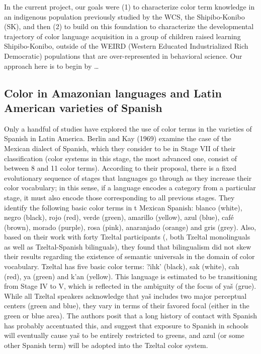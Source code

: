 \documentclass[man]{apa6}
\theoremstyle{definition}
\theoremstyle{definition}
\theoremstyle{definition}
\theoremstyle{remark}
\begin{document}
In the current project, our goals were (1) to characterize color term
knowledge in an indigenous population previously studied by the WCS, the
Shipibo-Konibo (SK), and then (2) to build on this foundation to
characterize the developmental trajectory of color language acquisition
in a group of children raised learning Shipibo-Konibo, outside of the
WEIRD (Western Educated Industrialized Rich Democratic) populations that
are over-represented in behavioral science. Our approach here is to
begin by \ldots{}

\subsection{Color in Amazonian languages and Latin American varieties of
Spanish}\label{color-in-amazonian-languages-and-latin-american-varieties-of-spanish}

Only a handful of studies have explored the use of color terms in the
varieties of Spanish in Latin America. Berlin and Kay (1969) examine the
case of the Mexican dialect of Spanish, which they consider to be in
Stage VII of their classification (color systems in this stage, the most
advanced one, consist of between 8 and 11 color terms). According to
their proposal, there is a fixed evolutionary sequence of stages that
languages go through as they increase their color vocabulary; in this
sense, if a language encodes a category from a particular stage, it must
also encode those corresponding to all previous stages. They identify
the following basic color terms in t Mexican Spanish: blanco (white),
negro (black), rojo (red), verde (green), amarillo (yellow), azul
(blue), café (brown), morado (purple), rosa (pink), anaranjado (orange)
and gris (grey). Also, based on their work with forty Tzeltal
participants (, both Tzeltal monolinguals as well as Tzeltal-Spanish
bilinguals), they found that bilingualism did not skew their results
regarding the existence of semantic universals in the domain of color
vocabulary. Tzeltal has five basic color terms: ?ihk' (black), sak
(white), cah (red), ya (green) and k'an (yellow). This language is
estimated to be transitioning from Stage IV to V, which is reflected in
the ambiguity of the focus of yaš (grue). While all Tzeltal speakers
acknowledge that yaš includes two major perceptual centers (green and
blue), they vary in terms of their favored focal (either in the green or
blue area). The authors posit that a long history of contact with
Spanish has probably accentuated this, and suggest that exposure to
Spanish in schools will eventually cause yaš to be entirely restricted
to greens, and azul (or some other Spanish term) will be adopted into
the Tzeltal color system.
\end{document}
